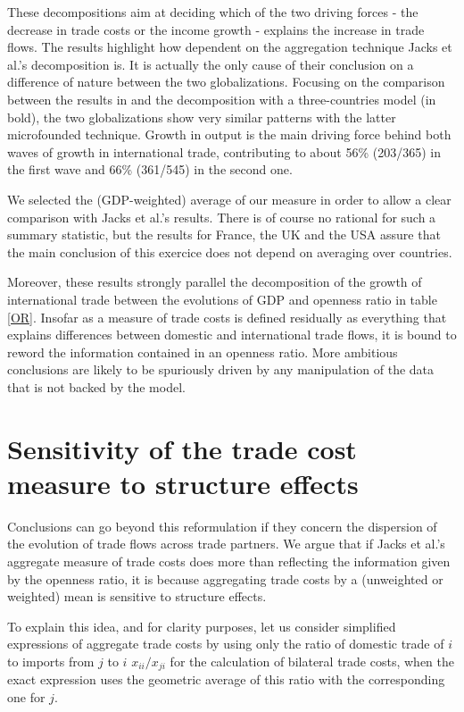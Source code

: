 \documentclass{article}
\begin{document}
These decompositions aim at deciding which of the two driving
forces - the decrease in trade costs or the income growth -
explains the increase in trade flows. The results highlight how
dependent on the aggregation technique Jacks et al.'s
decomposition is. It is actually the only cause of their
conclusion on a difference of nature between the two
globalizations. Focusing on the comparison between the results
in \cite{JMN2011} and the decomposition with a three-countries
model (in bold), the two globalizations show very similar
patterns with the latter microfounded technique. Growth in
output is the main driving force behind both waves of growth in
international trade, contributing to about 56\% (203/365) in
the first wave and 66\% (361/545) in the second one.

We selected the (GDP-weighted) average of our measure in order
to allow a clear comparison with Jacks et al.'s results. There
is of course no rational for such a summary statistic, but the
results for France, the UK and the USA assure that the main
conclusion of this exercice does not depend on averaging over
countries.

Moreover, these results strongly parallel the decomposition of
the growth of international trade between the evolutions of GDP
and openness ratio in table \ref{OR}. Insofar as a measure of
trade costs is defined residually as everything that explains
differences between domestic and international trade flows, it
is bound to reword the information contained in an openness
ratio. More ambitious conclusions are likely to be spuriously
driven by any manipulation of the data that is not backed by
the model.

\section{\label{3} Sensitivity of the trade cost measure to
structure effects}

Conclusions can go beyond this reformulation if they concern
the dispersion of the evolution of trade flows across trade
partners. We argue that if Jacks et al.'s aggregate measure of
trade costs does more than reflecting the information given by
the openness ratio, it is because aggregating trade costs by a
(unweighted or weighted) mean is sensitive to structure
effects.

To explain this idea, and for clarity purposes, let us consider
simplified expressions of aggregate trade costs by using only
the ratio of domestic trade of $i$ to imports from $j$ to $i$
$x_{ii}/x_{ji}$ for the calculation of bilateral trade costs,
when the exact expression uses the geometric average of this
ratio with the corresponding one for $j$.
\end{document}
